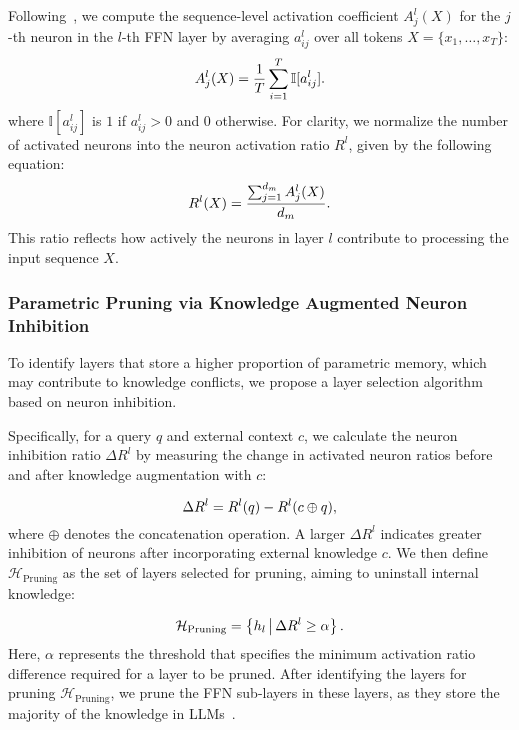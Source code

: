 Following~\citet{fan2025slam}, we compute the sequence-level activation coefficient $A^l_j(X)$ for the $j$-th neuron in the $l$-th FFN layer by averaging $a_{ij}^l$ over all tokens $X=\{x_1, \dots, x_T\}$:
\begin{equation}\small
    \label{eq:activation_numbers}
    A^l_j (X) =  \frac{1}{T} \sum_{i=1}^{T} \mathbb{I}[a_{ij}^l].
\end{equation}
where $\mathbb{I}[a_{ij}^l]$ is $1$ if $a_{ij}^l>0$ and 0 otherwise. For clarity, we normalize the number of activated neurons into the neuron activation ratio $R^l$, given by the following equation:
\begin{equation}\small
    \label{eq:activation_ratio}
    R^l (X) = \frac{\sum_{j=1}^{d_{m}} A^l_j (X)}{d_m}.
\end{equation}
This ratio reflects how actively the neurons in layer $l$ contribute to processing the input sequence $X$.


\subsubsection{Parametric Pruning via Knowledge Augmented Neuron Inhibition} 
To identify layers that store a higher proportion of parametric memory, which may contribute to knowledge conflicts, we propose a layer selection algorithm based on neuron inhibition.

Specifically, for a query $q$ and external context $c$, we calculate the neuron inhibition ratio $\Delta R^l$ by measuring the change in activated neuron ratios before and after knowledge augmentation with $c$:


\begin{equation}\small
    \label{eq:difference}
    \Delta R^l = R^l (q) -  R^l (c \oplus q),
\end{equation}
where $\oplus$ denotes the concatenation operation. A larger $\Delta R^l$ indicates greater inhibition of neurons after incorporating external knowledge $c$. We then define $\mathcal{H}_\text{Pruning}$ as the set of layers selected for pruning, aiming to uninstall internal knowledge:

\begin{equation}\small
    \label{eq:selct_layers}
    \mathcal{H}_\text{Pruning} = 
    \left\{
    h_l \,\middle|\,
    \Delta R^l \geq \alpha
    \right\}.
\end{equation}
Here, $\alpha$ represents the threshold that specifies the minimum activation ratio difference required for a layer to be pruned. After identifying the layers for pruning $\mathcal{H}_\text{Pruning}$, we prune the FFN sub-layers in these layers, as they store the majority of the knowledge in LLMs~\cite{geva2022transformer,geva2020transformer,meng2022locating,meng2022mass}.

